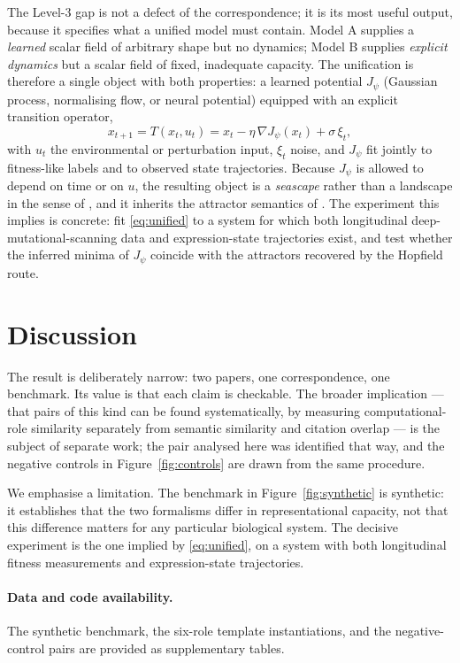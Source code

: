 \documentclass[11pt]{article}
\begin{document}
The Level-3 gap is not a defect of the correspondence; it is its most useful output, because it specifies what a
unified model must contain. Model A supplies a \emph{learned} scalar field of arbitrary shape but no dynamics;
Model B supplies \emph{explicit dynamics} but a scalar field of fixed, inadequate capacity. The unification is
therefore a single object with both properties: a learned potential $J_\psi$ (Gaussian process, normalising flow, or
neural potential) equipped with an explicit transition operator,
\begin{equation}
x_{t+1} = T\!\left(x_t,u_t\right) = x_t - \eta \,\nabla J_\psi(x_t) + \sigma\,\xi_t ,
\label{eq:unified}
\end{equation}
with $u_t$ the environmental or perturbation input, $\xi_t$ noise, and $J_\psi$ fit jointly to fitness-like labels
and to observed state trajectories. Because $J_\psi$ is allowed to depend on time or on $u$, the resulting object is
a \emph{seascape} rather than a landscape in the sense of \citet{mustonen2009seascapes}, and it inherits the
attractor semantics of \citet{wang2011waddington}. The experiment this implies is concrete: fit
\eqref{eq:unified} to a system for which both longitudinal deep-mutational-scanning data and expression-state
trajectories exist, and test whether the inferred minima of $J_\psi$ coincide with the attractors recovered by the
Hopfield route.

\section{Discussion}
The result is deliberately narrow: two papers, one correspondence, one benchmark. Its value is that each claim is
checkable. The broader implication --- that pairs of this kind can be found systematically, by measuring
computational-role similarity separately from semantic similarity and citation overlap --- is the subject of
separate work; the pair analysed here was identified that way, and the negative controls in Figure~\ref{fig:controls}
are drawn from the same procedure.

We emphasise a limitation. The benchmark in Figure~\ref{fig:synthetic} is synthetic: it establishes that the two
formalisms differ in representational capacity, not that this difference matters for any particular biological
system. The decisive experiment is the one implied by \eqref{eq:unified}, on a system with both longitudinal
fitness measurements and expression-state trajectories.

\paragraph{Data and code availability.} The synthetic benchmark, the six-role template instantiations, and the
negative-control pairs are provided as supplementary tables.


\end{document}
